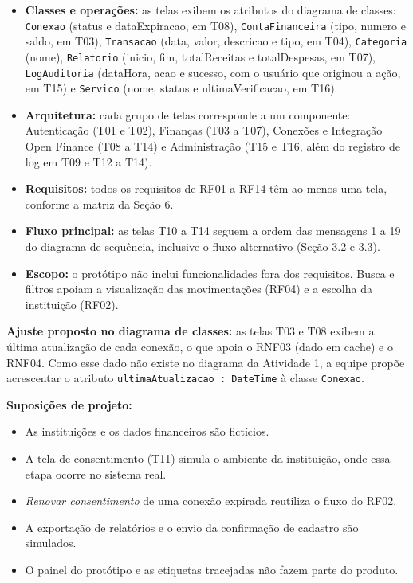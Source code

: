 \documentclass[11pt,a4paper]{article}
\newcommand{\cls}[1]{\texttt{#1}}
\begin{document}
\begin{itemize}
\item \textbf{Classes e operações:} as telas exibem os atributos do diagrama de classes: \cls{Conexao} (status e dataExpiracao, em T08), \cls{ContaFinanceira} (tipo, numero e saldo, em T03), \cls{Transacao} (data, valor, descricao e tipo, em T04), \cls{Categoria} (nome), \cls{Relatorio} (inicio, fim, totalReceitas e totalDespesas, em T07), \cls{LogAuditoria} (dataHora, acao e sucesso, com o usuário que originou a ação, em T15) e \cls{Servico} (nome, status e ultimaVerificacao, em T16).
\item \textbf{Arquitetura:} cada grupo de telas corresponde a um componente: Autenticação (T01 e T02), Finanças (T03 a T07), Conexões e Integração Open Finance (T08 a T14) e Administração (T15 e T16, além do registro de log em T09 e T12 a T14).
\item \textbf{Requisitos:} todos os requisitos de RF01 a RF14 têm ao menos uma tela, conforme a matriz da Seção 6.
\item \textbf{Fluxo principal:} as telas T10 a T14 seguem a ordem das mensagens 1 a 19 do diagrama de sequência, inclusive o fluxo alternativo (Seção 3.2 e 3.3).
\item \textbf{Escopo:} o protótipo não inclui funcionalidades fora dos requisitos. Busca e filtros apoiam a visualização das movimentações (RF04) e a escolha da instituição (RF02).
\end{itemize}

\textbf{Ajuste proposto no diagrama de classes:} as telas T03 e T08 exibem a última atualização de cada conexão, o que apoia o RNF03 (dado em cache) e o RNF04. Como esse dado não existe no diagrama da Atividade 1, a equipe propõe acrescentar o atributo \cls{ultimaAtualizacao : DateTime} à classe \cls{Conexao}.

\textbf{Suposições de projeto:}
\begin{itemize}
\item As instituições e os dados financeiros são fictícios.
\item A tela de consentimento (T11) simula o ambiente da instituição, onde essa etapa ocorre no sistema real.
\item \emph{Renovar consentimento} de uma conexão expirada reutiliza o fluxo do RF02.
\item A exportação de relatórios e o envio da confirmação de cadastro são simulados.
\item O painel do protótipo e as etiquetas tracejadas não fazem parte do produto.
\end{itemize}
\end{document}
